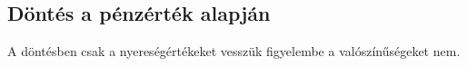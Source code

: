 \documentclass[a4paper,12pt]{article}
\begin{document}






\subsection{Döntés a pénzérték alapján}
\label{susec:penzert}
A döntésben csak a nyereségértékeket vesszük figyelembe a valószínűségeket nem.
\end{document}

